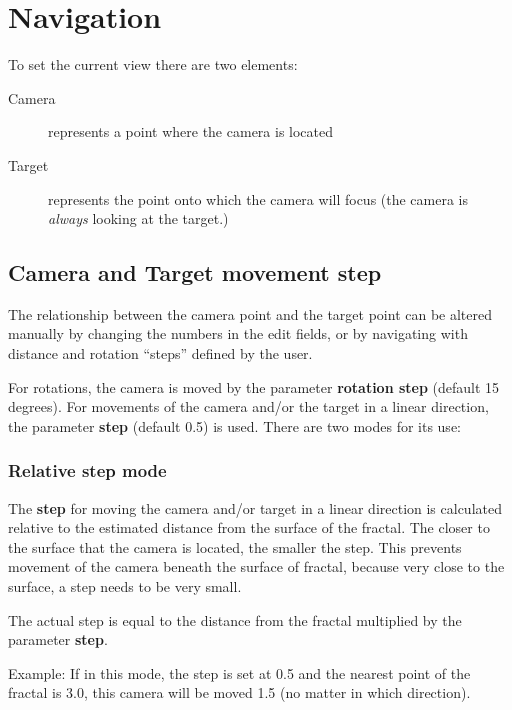 \section{Navigation}\label{navigation}

To set the current view there are two elements:

\begin{description}
	\item[Camera] represents a point where the camera is located
	\item[Target] represents the point onto which the camera will focus (the
	camera is \emph{always} looking at the target.)
\end{description}

\subsection{Camera and Target movement
	step}\label{camera-and-target-movement-step}

The relationship between the camera point and the target point can be altered
manually by changing the numbers in the edit fields, or by navigating with
distance and rotation ``steps'' defined by the user.

For rotations, the camera is moved by the parameter \textbf{rotation step}
(default 15 degrees). For movements of the camera and/or the target in a linear
direction, the parameter \textbf{step} (default 0.5) is used. There are two
modes for its use:

\subsubsection{Relative step mode}\label{relative-step-mode}

The \textbf{step} for moving the camera and/or target in a linear direction is
calculated relative to the estimated distance from the surface of the fractal.
The closer to the surface that the camera is located, the smaller the step. This
prevents movement of the camera beneath the surface of fractal, because very
close to the surface, a step needs to be very small.

The actual step is equal to the distance from the fractal multiplied by the
parameter \textbf{step}.

Example: If in this mode, the step is set at 0.5 and the nearest point of the
fractal is 3.0, this camera will be moved 1.5 (no matter in which direction).

